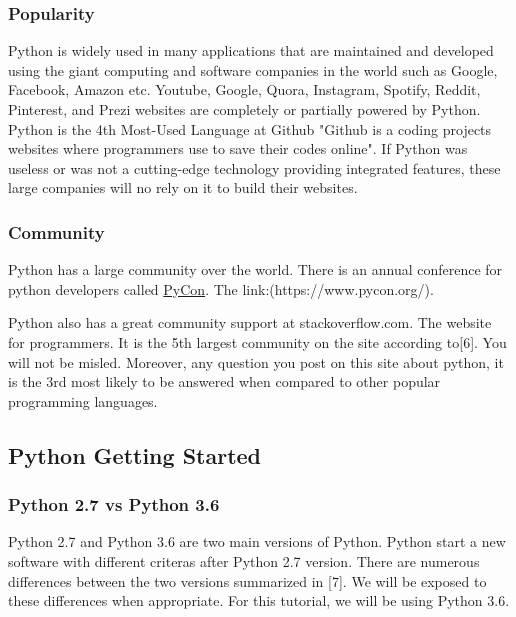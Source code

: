 \documentclass[11pt]{article}
\begin{document}
    \subsubsection{Popularity}\label{popularity}

    Python is widely used in many applications that are maintained and
developed using the giant computing and software companies in the world
such as Google, Facebook, Amazon etc. Youtube, Google, Quora, Instagram,
Spotify, Reddit, Pinterest, and Prezi websites are completely or
partially powered by Python. Python is the 4th Most-Used Language at
Github "Github is a coding projects websites where programmers use to
save their codes online". If Python was useless or was not a
cutting-edge technology providing integrated features, these large
companies will no rely on it to build their websites.

    \subsubsection{Community}\label{community}

    Python has a large community over the world. There is an annual
conference for python developers called
\href{https://www.pycon.org/}{PyCon}. The link:(https://www.pycon.org/).

Python also has a great community support at stackoverflow.com. The
website for programmers. It is the 5th largest community on the site
according to{[}6{]}. You will not be misled. Moreover, any question you
post on this site about python, it is the 3rd most likely to be answered
when compared to other popular programming languages.

    \subsection{Python Getting Started}\label{python-getting-started}

    \subsubsection{Python 2.7 vs Python 3.6}\label{python-2.7-vs-python-3.6}

    Python 2.7 and Python 3.6 are two main versions of Python. Python start
a new software with different criteras after Python 2.7 version. There
are numerous differences between the two versions summarized in {[}7{]}.
We will be exposed to these differences when appropriate. For this
tutorial, we will be using Python 3.6.
\end{document}
